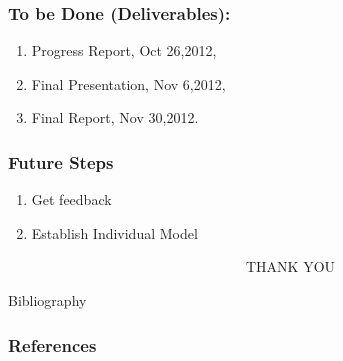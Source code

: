 \documentclass[compress,handout,10pt]{beamer}
\let\olditem\item
\renewcommand{\item}{\setlength{\itemsep}{0.5\baselineskip}\olditem}
\begin{document}
\begin{frame}
  \frametitle{To be Done (Deliverables):}
	\begin{enumerate}
	      \item Progress Report, Oct 26,2012,
                 \item Final Presentation, Nov 6,2012,
                 \item Final Report, Nov 30,2012.	
	\end{enumerate}
\end{frame}

\begin{frame}
  \frametitle{Future Steps}
	\begin {enumerate}
		\item Get feedback
		\item Establish Individual Model
	\end{enumerate}
\end{frame}

\begin{frame}
\vspace{20pt}
~~~~~~~~~~~~~~~~~~~~~~~~~~~~~~~~~~THANK YOU
\end{frame}

\begin{frame}[allowframebreaks]{Bibliography}
	\frametitle{References}

\renewcommand\bibname{Selected Bibliography Including Cited Works}
\nocite{*}

\end{frame}
\end{document}
